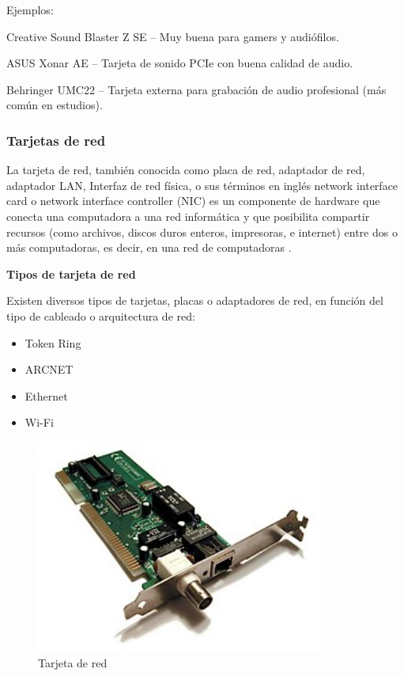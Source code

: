 Ejemplos:

Creative Sound Blaster Z SE – Muy buena para gamers y audiófilos.

ASUS Xonar AE – Tarjeta de sonido PCIe con buena calidad de audio.

Behringer UMC22 – Tarjeta externa para grabación de audio profesional (más común en estudios).

\subsubsection{Tarjetas de red}

La tarjeta de red, también conocida como placa de red, adaptador de red, adaptador LAN, Interfaz de red física, o sus términos en inglés network interface card o network interface controller (NIC) es un componente de hardware que conecta una computadora a una red informática y que posibilita compartir recursos (como archivos, discos duros enteros, impresoras, e internet) entre dos o más computadoras, es decir, en una red de computadoras \cite{wikitarjred}.

\textbf{Tipos de tarjeta de red}

Existen diversos tipos de tarjetas, placas o adaptadores de red, en función del tipo de cableado o arquitectura de red:

\begin{itemize}
  \item Token Ring
  \item ARCNET
  \item Ethernet
  \item Wi-Fi
\end{itemize}

\begin{figure}
  \centering
  \includegraphics[scale=0.8]{imagenes/tarjeta-red.png}
  \caption{Tarjeta de red}
\end{figure}

